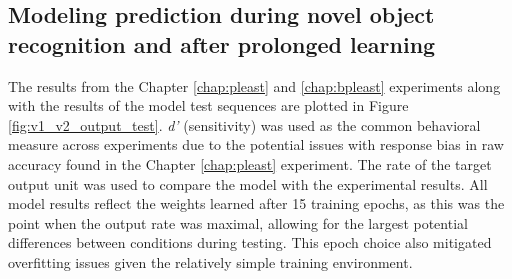\documentclass[dwyatte_dissertation.tex]{subfiles}
\begin{document}
\subsection{Modeling prediction during novel object recognition and after prolonged learning}
The results from the Chapter \ref{chap:pleast} and \ref{chap:bpleast} experiments along with the results of the model test sequences are plotted in Figure \ref{fig:v1_v2_output_test}. \textit{d'} (sensitivity) was used as the common behavioral measure across experiments due to the potential issues with response bias in raw accuracy found in the Chapter \ref{chap:pleast} experiment. The rate of the target output unit was used to compare the model with the experimental results. All model results reflect the weights learned after 15 training epochs, as this was the point when the output rate was maximal, allowing for the largest potential differences between conditions during testing. This epoch choice also mitigated overfitting issues given the relatively simple training environment.
\end{document}
